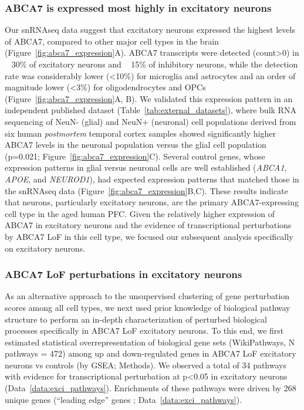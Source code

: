 \subsubsection{ABCA7 is expressed most highly in excitatory neurons}
Our snRNAseq data suggest that excitatory neurons expressed the highest levels of ABCA7, compared to other major cell types in the brain (Figure~\ref{fig:abca7_expression}A).  ABCA7 transcripts were detected (count>0) in ~ 30\% of excitatory neurons and ~ 15\% of inhibitory neurons, while the detection rate was considerably lower (<10\%) for microglia and astrocytes and an order of magnitude lower (<3\%) for oligodendrocytes and OPCs (Figure~\ref{fig:abca7_expression}A, B). We validated this expression pattern in an independent published dataset \cite{Welch2022-ef} (Table~\ref{tab:external_datasets}), where bulk RNA sequencing of NeuN- (glial) and NeuN+ (neuronal) cell populations derived from six human \textit{postmortem} temporal cortex samples showed significantly higher ABCA7 levels in the neuronal population versus the glial cell population (p=0.021; Figure~\ref{fig:abca7_expression}C). Several control genes, whose expression patterns in glial versus neuronal cells are well established (\textit{ABCA1}, \textit{APOE}, and \textit{NEUROD1}), had expected expression patterns that matched those in the snRNAseq data (Figure~\ref{fig:abca7_expression}B,C). These results indicate that neurons, particularly excitatory neurons, are the primary ABCA7-expressing cell type in the aged human PFC. Given the relatively higher expression of ABCA7 in excitatory neurons and the evidence of transcriptional perturbations by ABCA7 LoF in this cell type, we focused our subsequent analysis specifically on excitatory neurons.

\subsubsection{ABCA7 LoF perturbations in excitatory neurons}
As an alternative approach to the unsupervised clustering of gene perturbation scores among all cell types, we next used prior knowledge of biological pathway structure to perform an in-depth characterization of perturbed biological processes specifically in ABCA7 LoF excitatory neurons. To this end, we first estimated statistical overrepresentation of biological gene sets (WikiPathways, N pathways = 472) among up and down-regulated genes in ABCA7 LoF excitatory neurons vs controls (by GSEA; Methods). We observed a total of 34 pathways with evidence for transcriptional perturbation at p<0.05 in excitatory neurons (Data~\ref{data:exci_pathways}). Enrichments of these pathways were driven by 268 unique genes (“leading edge” genes \cite{Subramanian2005-pu}; Data~\ref{data:exci_pathways}).   

